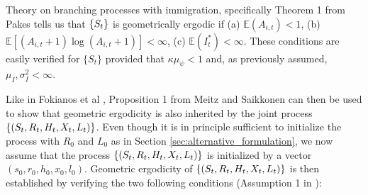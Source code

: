 \documentclass[review]{elsarticle}
\begin{document}
Theory on branching processes with immigration, specifically Theorem 1 from Pakes \cite{Pakes1971} tells us that $\{S_t\}$ is geometrically ergodic if (a) $\mathbb{E}(A_{i, t}) < 1$, (b) $\mathbb{E}[(A_{i, t} + 1)\log(A_{i, t} + 1)] < \infty$, (c) $\mathbb{E}(I^*_t) < \infty$. These conditions are easily verified for $\{S_t\}$ provided that $\kappa\mu_\psi < 1$ and, as previously assumed, $\mu_I, \sigma^2_I < \infty$.


Like in Fokianos et al \cite{Fokianos2009}, Proposition 1 from Meitz and Saikkonen \cite{Meitz2008} can then be used to show that geometric ergodicity is also inherited by the joint process $\{(S_t, R_t, H_t, X_t, L_t)\}$. %
Even though it is in principle sufficient to initialize the process with $R_0$ and $L_0$ as in Section \ref{sec:alternative_formulation}, we now assume that the process $\{(S_t, R_t, H_t, X_t, L_t)\}$ is initialized by a vector $(s_0, r_0, h_0, x_0, l_0)$. Geometric ergodicity of $\{(S_t, R_t, H_t, X_t, L_t)\}$ is then established by verifying the two following conditions (Assumption 1 in \cite{Meitz2008}):
\end{document}
